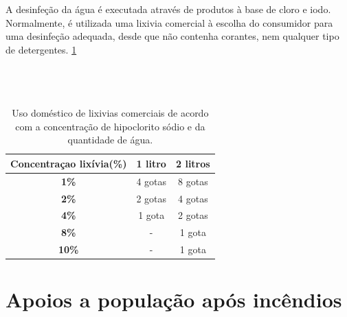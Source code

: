 \documentclass{report}
\begin{document}
A desinfeção da água é executada através de produtos à base de cloro e iodo. Normalmente, é utilizada uma lixivia comercial à escolha do consumidor para uma desinfeção adequada, desde que não contenha corantes, nem qualquer tipo de detergentes. \ref{tab1}\\\\\\\\
\begin{table}
\centering
\caption{Uso doméstico de lixivias comerciais de acordo com a concentração de hipoclorito sódio e da quantidade de água.}
\begin{tabular}{|c||c||c|}
\hline
\textbf{Concentraçao lixívia(\%)}     &  \textbf{1 litro}  &  \textbf{2 litros}  \\ \hline
	\textbf{1\%}		      &  4 gotas	   &  8 gotas   \\ \hline
	\textbf{2\%}		      &	 2 gotas	   &  4 gotas   \\ \hline
	\textbf{4\%}		      &  1 gota	     	   &  2 gotas   \\ \hline
	\textbf{8\%}		      &     -    	   &  1 gota    \\ \hline
	\textbf{10\%}		      &     -    	   &  1 gota    \\ \hline
\end{tabular}
\label{tab1}
\end{table}



\chapter{Apoios a população após incêndios}
\label{apoios à população após incêndios e prevenção de incêndios}
\cite{pgov2017}
\end{document}
